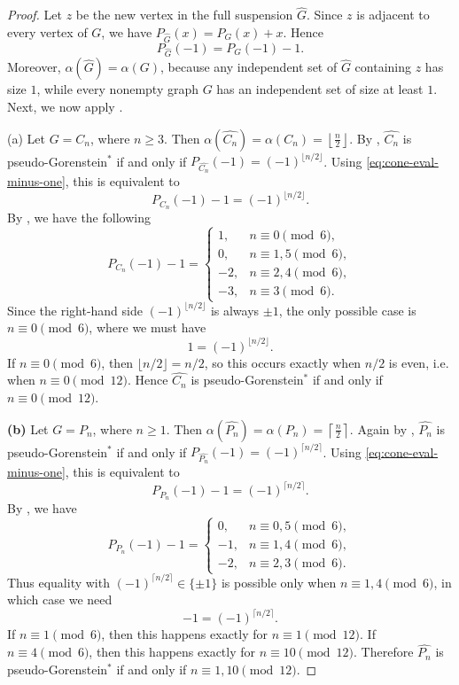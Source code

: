 \documentclass[12pt]{amsart}
\theoremstyle{plain}
\theoremstyle{definition}
\begin{document}
\begin{proof}
Let \(z\) be the new vertex in the full suspension \(\widehat{G}\).
Since \(z\) is adjacent to every vertex of \(G\), we have \(P_{\widehat{G}}(x)=P_G(x)+x\). Hence
\begin{equation}\label{eq:cone-eval-minus-one}
P_{\widehat{G}}(-1)=P_G(-1)-1.
\end{equation}
Moreover, \(\alpha(\widehat{G})=\alpha(G)\), because any independent set of
\(\widehat{G}\) containing \(z\) has size \(1\), while every nonempty graph \(G\)
has an independent set of size at least \(1\). Next, we now apply .


(a) Let \(G=C_n\), where \(n\ge 3\). Then
 \(\alpha(\widehat{C_n})=\alpha(C_n)=\left\lfloor \frac n2\right\rfloor\). By , \(\widehat{C_n}\) is pseudo-Gorenstein\(^{*}\) if and only if
\(P_{\widehat{C_n}}(-1)=(-1)^{\lfloor n/2\rfloor}
\). Using \eqref{eq:cone-eval-minus-one}, this is equivalent to
\[
P_{C_n}(-1)-1=(-1)^{\lfloor n/2\rfloor}.
\]
By , we have the following
\[
P_{C_n}(-1)-1=
\begin{cases}
1,& n\equiv 0 \pmod 6,\\[4pt]
0,& n\equiv 1,5 \pmod 6,\\[4pt]
-2,& n\equiv 2,4 \pmod 6,\\[4pt]
-3,& n\equiv 3 \pmod 6.
\end{cases}
\]
Since the right-hand side \( (-1)^{\lfloor n/2\rfloor}\) is always \(\pm 1\), the
only possible case is \(n\equiv 0\pmod 6\), where we must have
\[
1=(-1)^{\lfloor n/2\rfloor}.
\]
If \(n\equiv 0\pmod 6\), then \(\lfloor n/2\rfloor=n/2\), so this occurs exactly
when \(n/2\) is even, i.e. when \(n\equiv 0\pmod{12}\). Hence
\(\widehat{C_n}\) is pseudo-Gorenstein\(^{*}\) if and only if \(n\equiv 0\pmod{12}\).

\smallskip
\noindent
\textbf{(b)} Let \(G=P_n\), where \(n\ge 1\). Then
 \(\alpha(\widehat{P_n})=\alpha(P_n)=\left\lceil \frac n2\right\rceil\).
Again by , \(\widehat{P_n}\) is pseudo-Gorenstein\(^{*}\)
if and only if \(P_{\widehat{P_n}}(-1)=(-1)^{\lceil n/2\rceil}\). Using \eqref{eq:cone-eval-minus-one}, this is equivalent to
\[
P_{P_n}(-1)-1=(-1)^{\lceil n/2\rceil}.
\]
By , we have
\[
P_{P_n}(-1)-1=
\begin{cases}
0,& n\equiv 0,5 \pmod 6,\\[4pt]
-1,& n\equiv 1,4 \pmod 6,\\[4pt]
-2,& n\equiv 2,3 \pmod 6.
\end{cases}
\]
Thus equality with \( (-1)^{\lceil n/2\rceil}\in\{\pm1\}\) is possible only when
\(n\equiv 1,4\pmod 6\), in which case we need
\[
-1=(-1)^{\lceil n/2\rceil}.
\]
If \(n\equiv 1\pmod 6\), then this happens exactly for \(n\equiv 1\pmod{12}\).
If \(n\equiv 4\pmod 6\), then this happens exactly for \(n\equiv 10\pmod{12}\).
Therefore \(\widehat{P_n}\) is pseudo-Gorenstein\(^{*}\) if and only if \(n\equiv 1,10 \pmod{12}\).
\end{proof}
\end{document}
